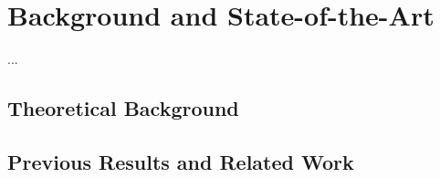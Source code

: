 \chapter{Background and State-of-the-Art}
\label{chap.stateoftheart}
...


\section{Theoretical Background}
%

\section{Previous Results and Related Work}
%